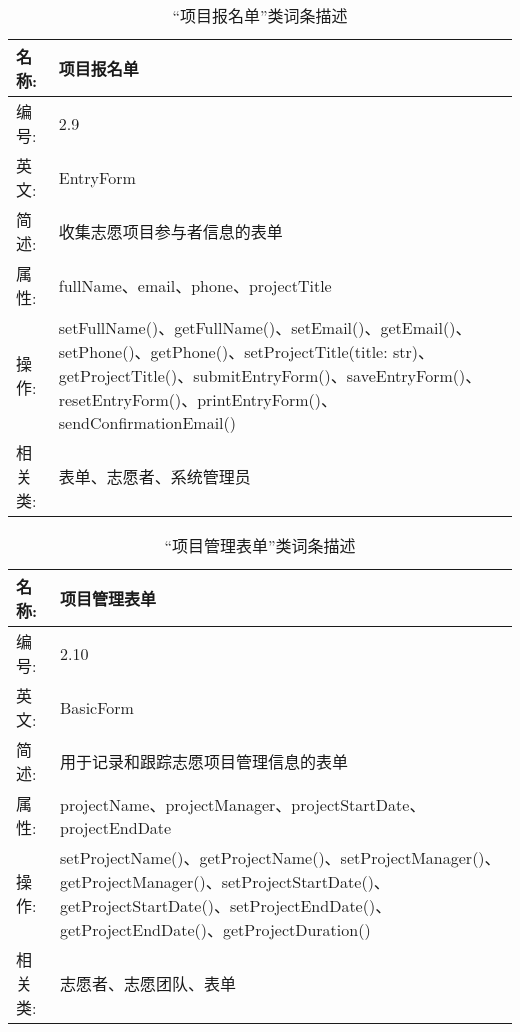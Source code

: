 \begin{table}[H]  
\caption{“项目报名单”类词条描述}  
\begin{center}  
    \begin{tabular}{l p{11cm}} 
        \hline
        \quad 名称:  &  项目报名单 \\
        \hline
        \quad 编号:  & 2.9 \\
        \hline
        \quad 英文:  &  EntryForm \\
        \hline
        \quad 简述:  & 收集志愿项目参与者信息的表单 \\
        \hline
        \quad 属性:  & fullName、email、phone、projectTitle\\
        \hline
        \quad 操作:  & setFullName()、getFullName()、setEmail()、getEmail()、setPhone()、getPhone()、setProjectTitle(title: str)、getProjectTitle()、submitEntryForm()、saveEntryForm()、resetEntryForm()、printEntryForm()、sendConfirmationEmail()
\\
        \hline
        \quad 相关类:  & 表单、志愿者、系统管理员 \\
        \hline
    \end{tabular}
\end{center}
\end{table}

\begin{table}[H]  
\caption{“项目管理表单”类词条描述}  
\begin{center}  
    \begin{tabular}{l p{11cm}} 
        \hline
        \quad 名称:  &  项目管理表单 \\
        \hline
        \quad 编号:  & 2.10 \\
        \hline
        \quad 英文:  &  BasicForm \\
        \hline
        \quad 简述:  & 用于记录和跟踪志愿项目管理信息的表单 \\
        \hline
        \quad 属性:  & projectName、projectManager、projectStartDate、projectEndDate\\
        \hline
        \quad 操作:  & setProjectName()、getProjectName()、setProjectManager()、getProjectManager()、setProjectStartDate()、getProjectStartDate()、setProjectEndDate()、getProjectEndDate()、getProjectDuration()\\
        \hline
        \quad 相关类:  & 志愿者、志愿团队、表单 \\
        \hline
    \end{tabular}
\end{center}
\end{table}
